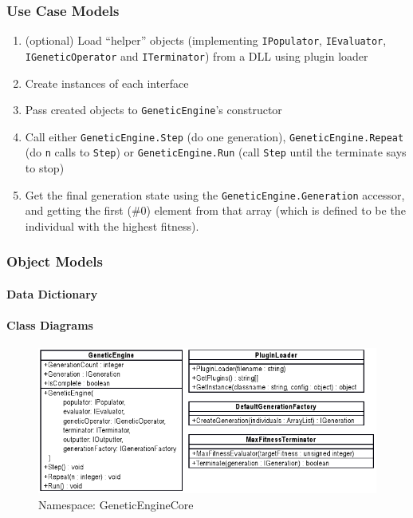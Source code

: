\subsubsection{Use Case Models}
% 
\begin{enumerate}
 \item (optional) Load ``helper'' objects (implementing \texttt{IPopulator}, \texttt{IEvaluator}, \texttt{IGeneticOperator} and \texttt{ITerminator}) from a DLL using plugin loader
 \item Create instances of each interface
 \item Pass created objects to \texttt{GeneticEngine}'s constructor
 \item Call either \texttt{GeneticEngine.Step} (do one generation), \texttt{GeneticEngine.Repeat} (do \texttt{n} calls to \texttt{Step}) or \texttt{GeneticEngine.Run} (call \texttt{Step} until the terminate says to stop) 
 \item Get the final generation state using the \texttt{GeneticEngine.Generation} accessor, and getting the first (\#0) element from that array (which is defined to be the individual with the highest fitness).
\end{enumerate}

\subsubsection{Object Models}
\paragraph{Data Dictionary}
\paragraph{Class Diagrams}

\begin{figure}[ht!]
 \caption{Namespace: GeneticEngineCore}
 \centering
 \includegraphics[width=\textwidth]{../GeneticEngineCoreDetail.png}
\end{figure}

